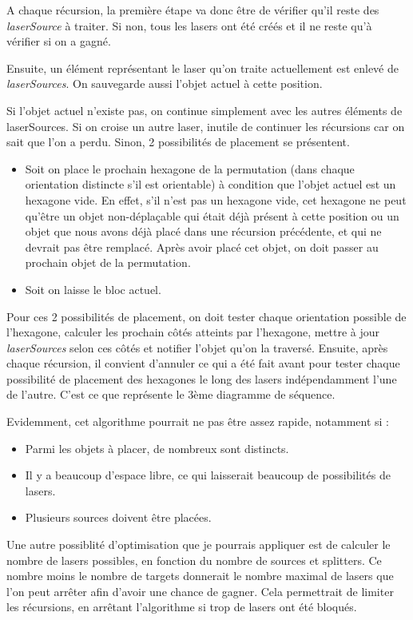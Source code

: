 \documentclass[]{article}
\begin{document}
A chaque récursion, la première étape va donc être de vérifier qu'il reste des \emph{laserSource} à traiter. Si non, tous les lasers ont été créés et il ne reste qu'à vérifier si on a gagné.

Ensuite, un élément représentant le laser qu'on traite actuellement est enlevé de \emph{laserSources}. On sauvegarde aussi l'objet actuel à cette position.

Si l'objet actuel n'existe pas, on continue simplement avec les autres éléments de laserSources. Si on croise un autre laser, inutile de continuer les récursions car on sait que l'on a perdu. Sinon, 2 possibilités de placement se présentent.
\begin{itemize}
\item Soit on place le prochain hexagone de la permutation (dans chaque orientation distincte s'il est orientable) à condition que l'objet actuel est un hexagone vide.
En effet, s'il n'est pas un hexagone vide, cet hexagone ne peut qu'être un objet non-déplaçable qui était déjà présent à cette position
ou un objet que nous avons déjà placé dans une récursion précédente, et qui ne devrait pas être remplacé.
Après avoir placé cet objet, on doit passer au prochain objet de la permutation.
\item Soit on laisse le bloc actuel.
\end{itemize}
Pour ces 2 possibilités de placement, on doit tester chaque orientation possible de l'hexagone, calculer les prochain côtés atteints par l'hexagone, mettre à jour \emph{laserSources} selon ces côtés et notifier  l'objet qu'on la traversé.
Ensuite, après chaque récursion, il convient d'annuler ce qui a été fait avant pour tester chaque possibilité de placement des hexagones le long des lasers indépendamment l'une de l'autre.
C'est ce que représente le 3ème diagramme de séquence.

Evidemment, cet algorithme pourrait ne pas être assez rapide, notamment si :
\begin{itemize}
\item Parmi les objets à placer, de nombreux sont distincts.
\item Il y a beaucoup d'espace libre, ce qui laisserait beaucoup de possibilités de lasers.
\item Plusieurs sources doivent être placées.
\end{itemize}

Une autre possiblité d'optimisation que je pourrais appliquer est de calculer le nombre de lasers possibles, en fonction du nombre de sources et splitters.
Ce nombre moins le nombre de targets donnerait le nombre maximal de lasers que l'on peut arrêter afin d'avoir une chance de gagner.
Cela permettrait de limiter les récursions, en arrêtant l'algorithme si trop de lasers ont été bloqués.
\end{document}
